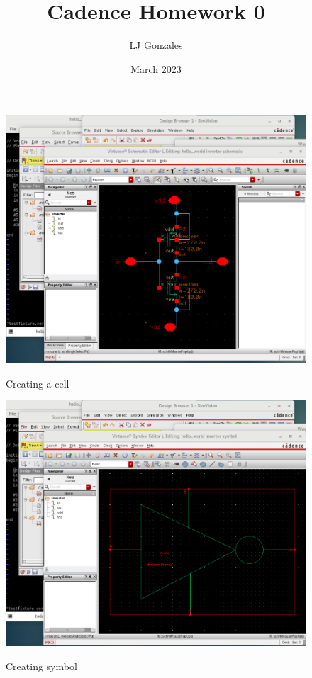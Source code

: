 \documentclass{article}
\title{Cadence Homework 0}
\author{LJ Gonzales}
\date{March 2023}
\begin{document}
\maketitle
\begin{figure}[h]
	\includegraphics[width =\textwidth]{schematic.png}
	\label{schematic}
	\caption{Creating a cell}
\end{figure}

\begin{figure}[h]
	\includegraphics[width =\textwidth]{symbol.png}
	\label{symbol}
	\caption{Creating symbol}
\end{figure}
\end{document}
